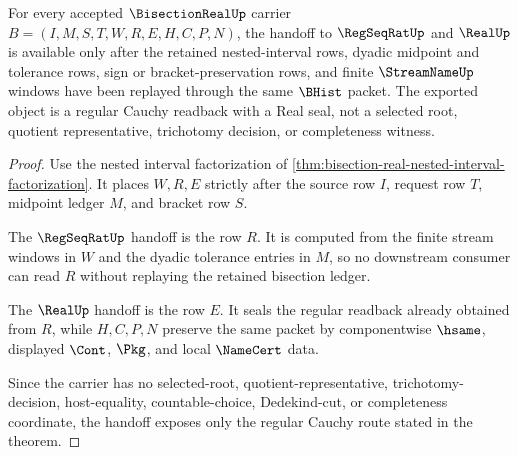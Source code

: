 \begin{theorem}
\label{thm:bisection-real-regular-cauchy-handoff}
For every accepted $\BisectionRealUp$ carrier $B=(I,M,S,T,W,R,E,H,C,P,N)$, the handoff to $\RegSeqRatUp$ and $\RealUp$ is available only after the retained nested-interval rows, dyadic midpoint and tolerance rows, sign or bracket-preservation rows, and finite $\StreamNameUp$ windows have been replayed through the same $\BHist$ packet. The exported object is a regular Cauchy readback with a Real seal, not a selected root, quotient representative, trichotomy decision, or completeness witness.
\end{theorem}
\begin{proof}
Use the nested interval factorization of \autoref{thm:bisection-real-nested-interval-factorization}. It places $W,R,E$ strictly after the source row $I$, request row $T$, midpoint ledger $M$, and bracket row $S$.

The $\RegSeqRatUp$ handoff is the row $R$. It is computed from the finite stream windows in $W$ and the dyadic tolerance entries in $M$, so no downstream consumer can read $R$ without replaying the retained bisection ledger.

The $\RealUp$ handoff is the row $E$. It seals the regular readback already obtained from $R$, while $H,C,P,N$ preserve the same packet by componentwise $\hsame$, displayed $\Cont$, $\Pkg$, and local $\NameCert$ data.

Since the carrier has no selected-root, quotient-representative, trichotomy-decision, host-equality, countable-choice, Dedekind-cut, or completeness coordinate, the handoff exposes only the regular Cauchy route stated in the theorem.
\end{proof}


\begin{closurestatus}{\BisectionRealUp}
  \theoryclosure{\seedClosure}
  \formalstatus{\unformalizedV}
\end{closurestatus}
